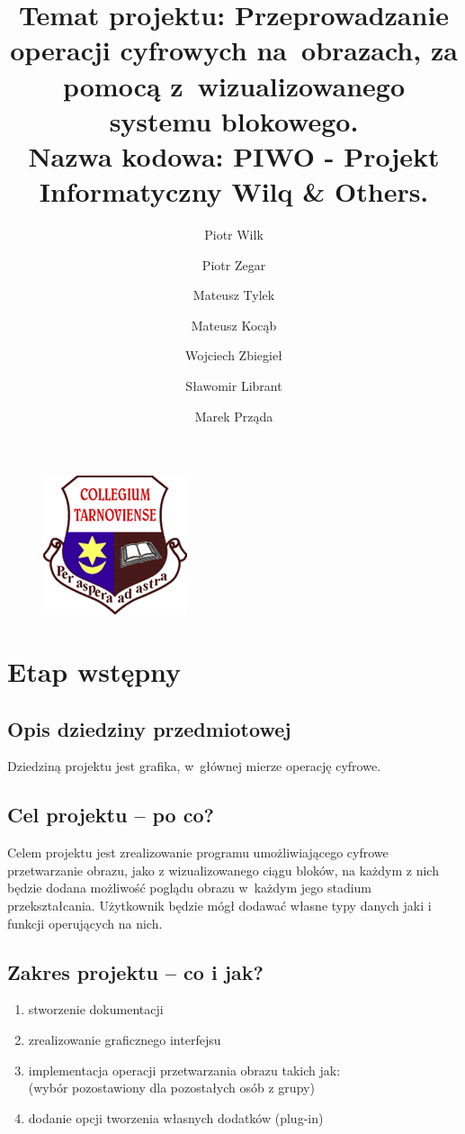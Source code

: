 \documentclass[a4paper,10pt]{article}
\title{Temat projektu: Przeprowadzanie operacji cyfrowych na~obrazach, za pomocą z~wizualizowanego systemu blokowego.\\Nazwa kodowa: PIWO - Projekt Informatyczny Wilq \& Others.}
\author{Piotr Wilk \and Piotr Zegar \and Mateusz Tylek \and Mateusz Kocąb \and Wojciech Zbiegieł \and Sławomir Librant \and  Marek Prząda}
\begin{document}
\maketitle
\begin{figure}[h]
 \centering
 \includegraphics{logo}
\begin{center}
\begin{center}

\end{center}

\end{center}

\end{figure}
\newpage
\tableofcontents
\newpage

\section{Etap wstępny}
\subsection{Opis dziedziny przedmiotowej}
Dziedziną projektu jest grafika, w~głównej mierze operację cyfrowe. 
\subsection{Cel projektu – po co?}
Celem projektu jest zrealizowanie programu umożliwiającego cyfrowe przetwarzanie obrazu, jako z wizualizowanego ciągu bloków, na każdym z nich będzie dodana możliwość poglądu obrazu w~każdym jego stadium przekształcania. Użytkownik będzie mógł dodawać własne typy danych jaki i funkcji operujących na nich. 
\subsection{Zakres projektu – co i jak?}
\begin{enumerate}
\item stworzenie dokumentacji
\item zrealizowanie graficznego interfejsu
\item implementacja operacji przetwarzania obrazu takich jak: \\
(wybór pozostawiony dla pozostałych osób z grupy)
\item dodanie opcji tworzenia własnych dodatków (plug-in)
\end{enumerate}
\end{document}
